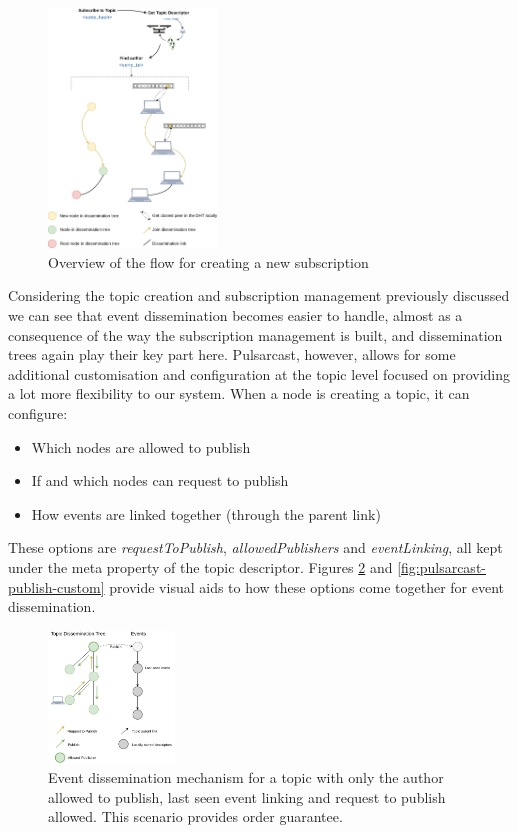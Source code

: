 \begin{figure}[hb!]
  \centering
  \includegraphics[width=0.4\textwidth]{../images/pulsarcast-subscription-flow.png}
  \caption{Overview of the flow for creating a new subscription}
  \label{fig:pulsarcast-subscription-flow}
\end{figure}

Considering the topic creation and subscription management previously discussed
we can see that event dissemination becomes easier to handle, almost as a
consequence of the way the subscription management is built, and dissemination
trees again play their key part here. Pulsarcast, however, allows for some
additional customisation and configuration at the topic level focused on
providing a lot more flexibility to our system. When a node is creating a
topic, it can configure:
\begin{itemize}
  \item
    Which nodes are allowed to publish
  \item
     If and which nodes can request to publish
  \item
    How events are linked together (through the parent link)
\end{itemize}

These options are \emph{requestToPublish}, \emph{allowedPublishers} and
\emph{eventLinking}, all kept under the meta property of the topic descriptor.
Figures \ref{fig:pulsarcast-publish-order-guarantee} and
\ref{fig:pulsarcast-publish-custom} provide visual aids to how these options
come together for event dissemination.

\begin{figure}[hb!]
  \centering
  \includegraphics[width=0.3\textwidth]{../images/pulsarcast-publish-order-guarantee.png}
  \caption{Event dissemination mechanism for a topic with only the author allowed to publish, last seen event linking and request to publish allowed. This scenario provides order guarantee.}
  \label{fig:pulsarcast-publish-order-guarantee}
\end{figure}

